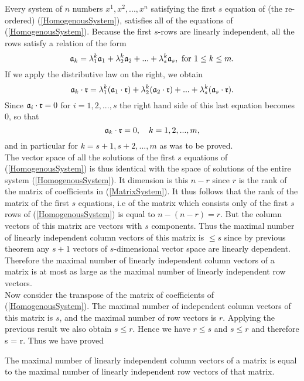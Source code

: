Every system of $n$ numbers $x^1, x^2, ..., x^n$ satisfying the first $s$ equation of (the re-ordered) (\ref{HomogenousSystem}), satisfies all of the equations of (\ref{HomogenousSystem}). Because
the first $s$-rows are linearly independent, all the rows satisfy a relation of the form
$$\mathfrak{a}_k = \lambda^k_1 \mathfrak{a}_1 + \lambda^k_2 \mathfrak{a}_2 + ...  + \lambda^k_s \mathfrak{a}_s, \hbox{~for~} 1\le k \le m.$$ If we apply the distributive law on the right, we obtain
$$\mathfrak{a}_k \cdot \mathfrak{r} =   \lambda^k_1 (\mathfrak{a}_1\cdot \mathfrak{r}) + \lambda^k_2 (\mathfrak{a}_2 \cdot \mathfrak{r})+ ...  + \lambda^k_s (\mathfrak{a}_s\cdot \mathfrak{r}).$$ Since $\mathfrak{a}_i \cdot \mathfrak{r} = 0$ for $i = 1,2, ..., s$ the right hand side 
of this last equation becomes $0$, so that $$\mathfrak{a}_k \cdot \mathfrak{r} = 0, \quad k = 1,2, ..., m,$$ and in particular for $k = s+1, s+2, ..., m$ as was to be proved.\\

The vector space of all the solutions of the first $s$ equations of (\ref{HomogenousSystem}) is thus identical with the space of solutions of the entire system (\ref{HomogenousSystem}). It dimension is this $n-r$
since $r$ is the rank of the matrix of coefficients in (\ref{MatrixSystem}). It thus follows that the rank of the matrix of the first $s$ equations, i.e of the matrix which consists only of the first $s$ rows of (\ref{HomogenousSystem})
is equal to $n - (n-r) = r$. But the column vectors of this matrix are vectors with $s$ components. Thus the maximal number of linearly independent column vectors of this matrix is $\le s$ since by previous theorem
any $s+1$ vectors of $s$-dimensional vector space are linearly dependent. \\

Therefore the maximal number of linearly independent column vectors of a matrix is at most as large as the maximal number of linearly independent row vectors. \\

Now consider the transpose of the matrix of coefficients of (\ref{HomogenousSystem}). The maximal number of independent column vectors of this matrix is $s$, and the maximal number of row vectors is $r$.
Applying the previous result we also obtain $s\le r$. Hence we have $r \le s$ and $s\le r$ and therefore s = r. Thus we have proved

\begin{theorem}
The maximal number of linearly independent column vectors of a matrix is equal to the maximal number of linearly independent row vectors of that matrix. 
\end{theorem}

